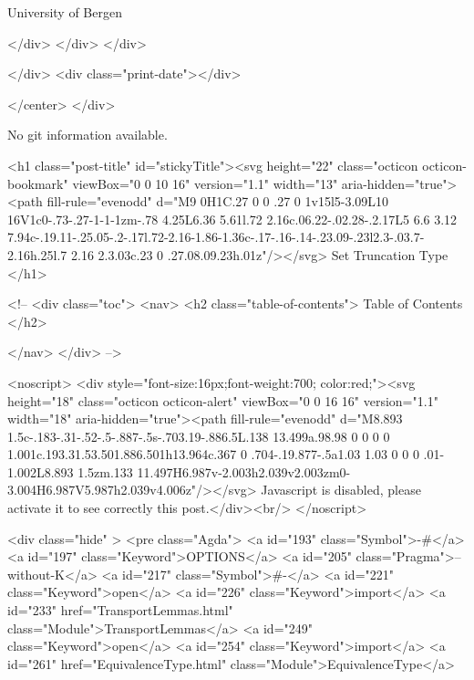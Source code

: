                   University of Bergen
                
                </div>
            </div>
          </div>
          
          
        </div>
        <div class="print-date"></div>
        
        
    </center>
  </div>

  
  No git information available.
  
  <h1 class="post-title" id="stickyTitle"><svg height="22" class="octicon octicon-bookmark" viewBox="0 0 10 16" version="1.1" width="13" aria-hidden="true"><path fill-rule="evenodd" d="M9 0H1C.27 0 0 .27 0 1v15l5-3.09L10 16V1c0-.73-.27-1-1-1zm-.78 4.25L6.36 5.61l.72 2.16c.06.22-.02.28-.2.17L5 6.6 3.12 7.94c-.19.11-.25.05-.2-.17l.72-2.16-1.86-1.36c-.17-.16-.14-.23.09-.23l2.3-.03.7-2.16h.25l.7 2.16 2.3.03c.23 0 .27.08.09.23h.01z"/></svg> Set Truncation Type
  </h1>

  <!-- 
  <div class="toc">
    <nav>
    <h2 class="table-of-contents"> Table of Contents </h2>
      

    </nav>
  </div>
   -->

  <noscript>
  <div style="font-size:16px;font-weight:700; color:red;"><svg height="18" class="octicon octicon-alert" viewBox="0 0 16 16" version="1.1" width="18" aria-hidden="true"><path fill-rule="evenodd" d="M8.893 1.5c-.183-.31-.52-.5-.887-.5s-.703.19-.886.5L.138 13.499a.98.98 0 0 0 0 1.001c.193.31.53.501.886.501h13.964c.367 0 .704-.19.877-.5a1.03 1.03 0 0 0 .01-1.002L8.893 1.5zm.133 11.497H6.987v-2.003h2.039v2.003zm0-3.004H6.987V5.987h2.039v4.006z"/></svg> Javascript is disabled, please activate it to see correctly this post.</div><br/>
  </noscript>

  <div class="hide" >
<pre class="Agda">
<a id="193" class="Symbol">{-#</a> <a id="197" class="Keyword">OPTIONS</a> <a id="205" class="Pragma">--without-K</a> <a id="217" class="Symbol">#-}</a>
<a id="221" class="Keyword">open</a> <a id="226" class="Keyword">import</a> <a id="233" href="TransportLemmas.html" class="Module">TransportLemmas</a>
<a id="249" class="Keyword">open</a> <a id="254" class="Keyword">import</a> <a id="261" href="EquivalenceType.html" class="Module">EquivalenceType</a>

